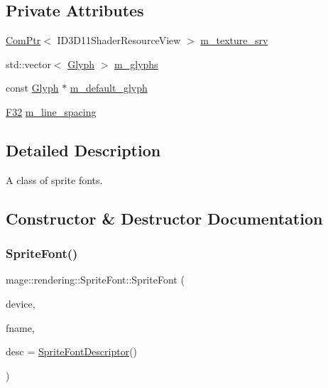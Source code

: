\subsection*{Private Attributes}
\begin{DoxyCompactItemize}
\item 
\hyperlink{namespacemage_ae74f374780900893caa5555d1031fd79}{Com\+Ptr}$<$ I\+D3\+D11\+Shader\+Resource\+View $>$ \hyperlink{classmage_1_1rendering_1_1_sprite_font_acdd3ca40befd9508a20011769046256e}{m\+\_\+texture\+\_\+srv}
\item 
std\+::vector$<$ \hyperlink{structmage_1_1rendering_1_1_glyph}{Glyph} $>$ \hyperlink{classmage_1_1rendering_1_1_sprite_font_aba69731bf4701ab790b1575515de22b9}{m\+\_\+glyphs}
\item 
const \hyperlink{structmage_1_1rendering_1_1_glyph}{Glyph} $\ast$ \hyperlink{classmage_1_1rendering_1_1_sprite_font_a0d60c46888b2b2a2c1787dcf6f0e041b}{m\+\_\+default\+\_\+glyph}
\item 
\hyperlink{namespacemage_aa97e833b45f06d60a0a9c4fc22ae02c0}{F32} \hyperlink{classmage_1_1rendering_1_1_sprite_font_acc3c1cefce72befc5c16db5ec39dd61f}{m\+\_\+line\+\_\+spacing}
\end{DoxyCompactItemize}


\subsection{Detailed Description}
A class of sprite fonts. 

\subsection{Constructor \& Destructor Documentation}
\hypertarget{classmage_1_1rendering_1_1_sprite_font_a6080794a32e8e4fa4b2be7392a4e9466}{}\label{classmage_1_1rendering_1_1_sprite_font_a6080794a32e8e4fa4b2be7392a4e9466} 
\subsubsection{\texorpdfstring{Sprite\+Font()}{SpriteFont()}\hspace{0.1cm}{\footnotesize\ttfamily [1/3]}}
{\footnotesize\ttfamily mage\+::rendering\+::\+Sprite\+Font\+::\+Sprite\+Font (\begin{DoxyParamCaption}\item[{I\+D3\+D11\+Device \&}]{device,  }\item[{wstring}]{fname,  }\item[{const \hyperlink{classmage_1_1rendering_1_1_sprite_font_descriptor}{Sprite\+Font\+Descriptor} \&}]{desc = {\ttfamily \hyperlink{classmage_1_1rendering_1_1_sprite_font_descriptor}{Sprite\+Font\+Descriptor}()} }\end{DoxyParamCaption})\hspace{0.3cm}{\ttfamily [explicit]}}

